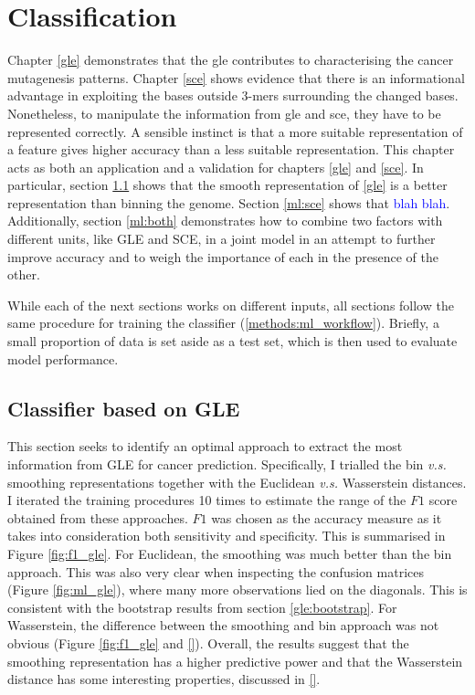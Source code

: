 \chapter{Classification}\label{ml}

Chapter \ref{gle} demonstrates that the \gls{gle} contributes to characterising the cancer mutagenesis patterns. Chapter \ref{sce} shows evidence that there is an informational advantage in exploiting the bases outside 3-mers surrounding the changed bases. Nonetheless, to manipulate the information from \gls{gle} and \gls{sce}, they have to be represented correctly. A sensible instinct is that a more suitable representation of a feature gives higher accuracy than a less suitable representation. This chapter acts as both an application and a validation for chapters \ref{gle} and \ref{sce}. In particular, section \ref{ml:gle} shows that the smooth representation of \ref{gle} is a better representation than binning the genome. Section \ref{ml:sce} shows that \textcolor{blue}{blah blah}. Additionally, section \ref{ml:both} demonstrates how to combine two factors with different units, like GLE and SCE, in a joint model in an attempt to further improve accuracy and to weigh the importance of each in the presence of the other.

While each of the next sections works on different inputs, all sections follow the same procedure for training the classifier (\ref{methods:ml_workflow}). Briefly, a small proportion of data is set aside as a test set, which is then used to evaluate model performance.

\section{Classifier based on GLE}\label{ml:gle}
This section seeks to identify an optimal approach to extract the most information from GLE for cancer prediction. Specifically, I trialled the bin \textit{v.s.} smoothing representations together with the Euclidean \textit{v.s.} Wasserstein distances. I iterated the training procedures 10 times to estimate the range of the $F1$ score obtained from these approaches. $F1$ was chosen as the accuracy measure as it takes into consideration both sensitivity and specificity. This is summarised in Figure \ref{fig:f1_gle}. For Euclidean, the smoothing was much better than the bin approach. This was also very clear when inspecting the confusion matrices (Figure \ref{fig:ml_gle}), where many more observations lied on the diagonals. This is consistent with the bootstrap results from section \ref{gle:bootstrap}. For Wasserstein, the difference between the smoothing and bin approach was not obvious (Figure \ref{fig:f1_gle} and \ref{}). Overall, the results suggest that the smoothing representation has a higher predictive power and that the Wasserstein distance has some interesting properties, discussed in \ref{}.


